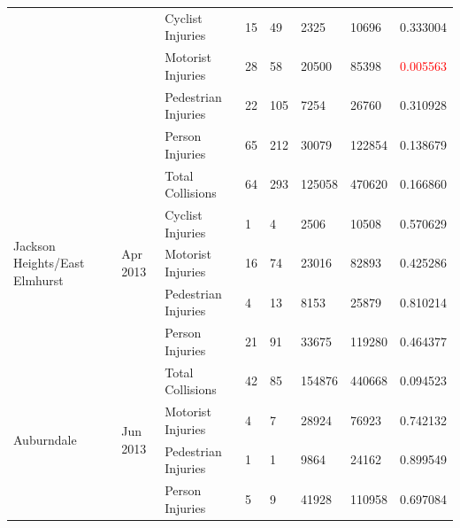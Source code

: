 \documentclass[10pt,journal,compsoc]{IEEEtran}
\begin{document}
\begin{table}[]
\begin{tabular}{|l|l|l|l|l|l|l|l|}
                                               &                             & Cyclist Injuries    & 15        & 49       & 2325       & 10696     & 0.333004 \\ \cline{3-8} 
                                               &                             & Motorist Injuries   & 28        & 58       & 20500      & 85398     & \textcolor{red}{0.005563} \\ \cline{3-8} 
                                               &                             & Pedestrian Injuries & 22        & 105      & 7254       & 26760     & 0.310928 \\ \cline{3-8} 
                                               &                             & Person Injuries     & 65        & 212      & 30079      & 122854    & 0.138679 \\ \hline
\multirow{5}{*}{Jackson Heights/East Elmhurst} & \multirow{5}{*}{Apr 2013} & Total Collisions    & 64        & 293      & 125058     & 470620    & 0.166860 \\ \cline{3-8} 
                                               &                             & Cyclist Injuries    & 1         & 4        & 2506       & 10508     & 0.570629 \\ \cline{3-8} 
                                               &                             & Motorist Injuries   & 16        & 74       & 23016      & 82893     & 0.425286 \\ \cline{3-8} 
                                               &                             & Pedestrian Injuries & 4         & 13       & 8153       & 25879     & 0.810214 \\ \cline{3-8} 
                                               &                             & Person Injuries     & 21        & 91       & 33675      & 119280    & 0.464377 \\ \hline
\multirow{4}{*}{Auburndale}                    & \multirow{4}{*}{Jun 2013} & Total Collisions    & 42        & 85       & 154876     & 440668    & 0.094523 \\ \cline{3-8} 
                                               &                             & Motorist Injuries   & 4         & 7        & 28924      & 76923     & 0.742132 \\ \cline{3-8} 
                                               &                             & Pedestrian Injuries & 1         & 1        & 9864       & 24162     & 0.899549 \\ \cline{3-8} 
                                               &                             & Person Injuries     & 5         & 9        & 41928      & 110958    & 0.697084 \\ \hline

\end{tabular}
\end{table}
\end{document}
